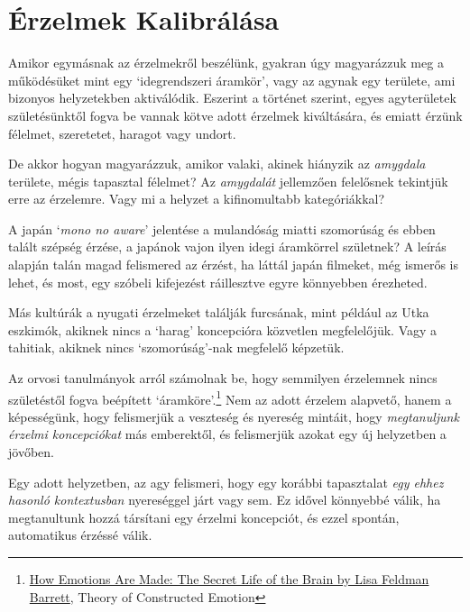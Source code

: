 \section{Érzelmek Kalibrálása}


\noindent Amikor egymásnak az érzelmekről beszélünk, gyakran úgy
magyarázzuk meg a működésüket mint egy `idegrendszeri áramkör', vagy az
agynak egy területe, ami bizonyos helyzetekben aktiválódik. Eszerint a
történet szerint, egyes agyterületek születésünktől fogva be vannak
kötve adott érzelmek kiváltására, és emiatt érzünk félelmet, szeretetet,
haragot vagy undort.

De akkor hogyan magyarázzuk, amikor valaki, akinek hiányzik az
\emph{amygdala} területe, mégis tapasztal félelmet? Az \emph{amygdalát}
jellemzően felelősnek tekintjük erre az érzelemre. Vagy mi a helyzet a
kifinomultabb kategóriákkal?

A japán `\emph{mono no aware}' jelentése a mulandóság miatti szomorúság
és ebben talált szépség érzése, a japánok vajon ilyen idegi áramkörrel
születnek? A leírás alapján talán magad felismered az érzést, ha láttál
japán filmeket, még ismerős is lehet, és most, egy szóbeli kifejezést
ráillesztve egyre könnyebben érezheted.

Más kultúrák a nyugati érzelmeket találják furcsának, mint például az
Utka eszkimók, akiknek nincs a `harag' koncepcióra közvetlen
megfelelőjük. Vagy a tahitiak, akiknek nincs `szomorúság'-nak megfelelő
képzetük.

\enlargethispage*{\baselineskip}

Az orvosi tanulmányok arról számolnak be, hogy semmilyen érzelemnek
nincs születéstől fogva beépített `áramköre'.\footnote{\href{https://www.goodreads.com/book/show/23719305-how-emotions-are-made}{How
  Emotions Are Made: The Secret Life of the Brain by Lisa Feldman
  Barrett}, Theory of Constructed Emotion} Nem az adott érzelem
alapvető, hanem a képességünk, hogy felismerjük a veszteség és nyereség
mintáit, hogy \emph{megtanuljunk érzelmi koncepciókat} más emberektől,
és felismerjük azokat egy új helyzetben a jövőben.

Egy adott helyzetben, az agy felismeri, hogy egy korábbi tapasztalat
\emph{egy ehhez hasonló kontextusban} nyereséggel járt vagy sem. Ez
idővel könnyebbé válik, ha megtanultunk hozzá társítani egy érzelmi
koncepciót, és ezzel spontán, automatikus érzéssé válik.


